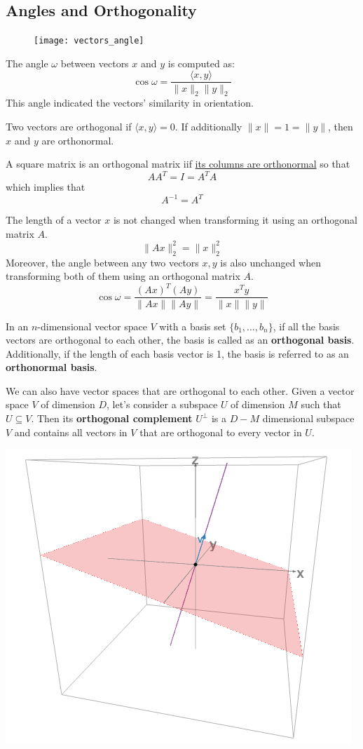 \documentclass{article}
\begin{document}
\subsection{Angles and Orthogonality}
\begin{figure}
    \begin{center}
        \texttt{[image: vectors\_angle]}
    \end{center}
\end{figure}
The angle $\omega$ between vectors $x$ and $y$ is computed as:
$$\cos\omega=\frac{\langle x,y\rangle}{\lVert x\rVert_2 \lVert y\rVert_2}$$ 
This angle indicated the vectors' similarity in orientation. 
\begin{definition}
    Two vectors are orthogonal if $\langle x,y \rangle=0$. If additionally
    $\lVert x\rVert=1=\lVert y\rVert$, then $x$ and $y$ are orthonormal.
\end{definition}
\begin{definition}
    A square matrix is an orthogonal matrix iif \underline{its columns are
    orthonormal} so that 
    $$AA^T=I=A^TA$$
    which implies that 
    $$A^{-1}=A^T$$
\end{definition}
The length of a vector $x$ is not changed when transforming it using an
orthogonal matrix $A$.
$$\lVert Ax\rVert_2^2=\lVert x\rVert_2^2$$
Moreover, the angle between any two vectors $x,y$ is also unchanged when
transforming both of them using an orthogonal matrix $A$.
$$\cos\omega=\frac{(Ax)^T(Ay)}{\lVert Ax\rVert \lVert
Ay\rVert}=\frac{x^Ty}{\lVert x\rVert \lVert y\rVert}$$
\begin{definition}
    In an $n$-dimensional vector space $V$ with a basis set
    $\{b_1,\ldots,b_n\}$, if all the basis vectors are orthogonal to each
    other, the basis is called as an \textbf{orthogonal basis}.
    Additionally, if the length of each basis vector is 1, the basis is
    referred to as an \textbf{orthonormal basis}.
\end{definition}
We can also have vector spaces that are orthogonal to each other. Given a
vector space $V$ of dimension $D$, let's  consider a subspace $U$ of dimension
$M$ such that $U\subseteq V$. Then its \textbf{orthogonal complement}
$U^{\perp}$ is a $D-M$ dimensional subspace $V$ and contains all vectors in
$V$ that are orthogonal to every vector in $U$.
\begin{center}
    \includegraphics[width=0.6\linewidth]{images/orthogonal_complement}
\end{center}
\end{document}
